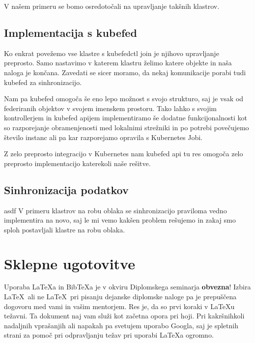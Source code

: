 \documentclass[a4paper, 12pt]{book}
\newcommand{\BibTeX}{{\sc Bib}\TeX}
\begin{document}
V našem primeru se bomo osredotočali na upravljanje takšnih klastrov.

\section{Implementacija s kubefed}
Ko enkrat povežemo vse klastre s kubefedctl join je njihovo upravljanje preprosto.
Samo nastavimo v katerem klastru želimo katere objekte in naša naloga je končana.
Zavedati se sicer moramo, da nekaj komunikacije porabi tudi kubefed za sinhronizacijo.

Nam pa kubefed omogoča še eno lepo možnost s svojo strukturo, saj je vsak od federiranih objektov v svojem imenskem prostoru.
Tako lahko s svojim kontrollerjem in kubefed apijem implementiramo še dodatne funkcijonalnosti kot so razporejanje obramenjenosti med lokalnimi strežniki in po potrebi povečujemo število instanc ali pa kar razporejamo opravila s Kubernetes Jobi.

Z zelo preprosto integracijo v Kubernetes nam kubefed api tu res omogoča zelo preprosto implementacijo katerekoli naše rešitve.
\section{Sinhronizacija podatkov}
asdf V primeru klastrov na robu oblaka se sinhronizacijo praviloma vedno implementira na novo, saj le mi vemo kakšen problem rešujemo in zakaj smo sploh postavljali klastre na robu oblaka.


\chapter{Sklepne ugotovitve}
Uporaba \LaTeX{a} in \BibTeX{a} je v okviru Diplomskega seminarja \textbf{obvezna}!
Izbira \LaTeX\ ali ne \LaTeX\ pri pisanju dejanske diplomske naloge pa je pre\-pu\-šče\-na dogovoru med vami in vašim mentorjem.
Res je, da so prvi koraki v \LaTeX{}u težavni. 
Ta dokument naj vam služi kot začetna opora pri hoji.
Pri kakršnihkoli nadaljnih vprašanjih ali napakah pa svetujem uporabo Googla, saj je spletnih strani za pomoč pri odpravljanju težav pri uporabi \LaTeX{}a ogromno.
\newpage %
\ \\
\clearpage
{}


\end{document}
